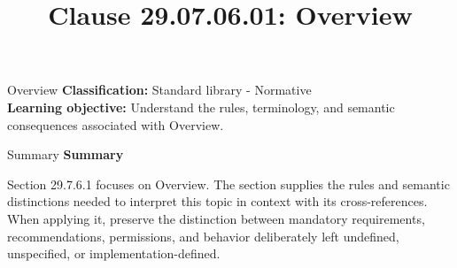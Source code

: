 \documentclass[10pt,letterpaper]{article}
\title{Clause 29.07.06.01: Overview}
\author{}
\date{}
\begin{document}
\maketitle
\begin{CornellOverviewBox}{Overview}
\textbf{Classification:} Standard library - Normative\\[2pt]
\textbf{Learning objective:} Understand the rules, terminology, and semantic consequences associated with Overview.
\end{CornellOverviewBox}\begin{CornellSummaryBox}{Summary}
{\sffamily\bfseries\color{Accent} Summary}\par\vspace{3pt}Section 29.7.6.1 focuses on Overview. The section supplies the rules and semantic distinctions needed to interpret this topic in context with its cross-references. When applying it, preserve the distinction between mandatory requirements, recommendations, permissions, and behavior deliberately left undefined, unspecified, or implementation-defined.
\end{CornellSummaryBox}
\end{document}

